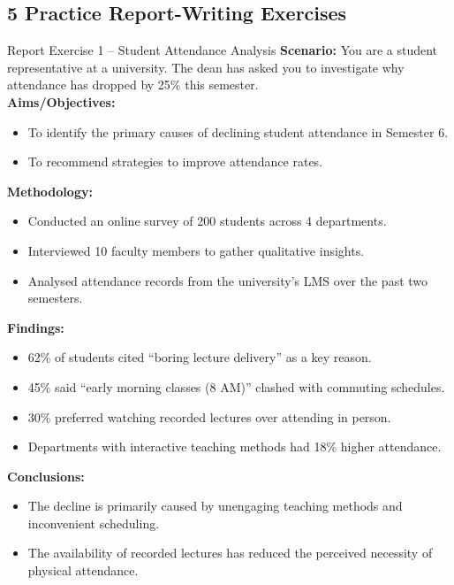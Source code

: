 \documentclass[12pt,a4paper]{article}
\begin{document}
\subsection{5 Practice Report-Writing Exercises}

\begin{exbox}{Report Exercise 1 -- Student Attendance Analysis}
\textbf{Scenario:} You are a student representative at a university. The dean has asked you to investigate why attendance has dropped by 25\% this semester.\\[0.3cm]

\textbf{Aims/Objectives:}
\begin{itemize}[noitemsep]
    \item To identify the primary causes of declining student attendance in Semester 6.
    \item To recommend strategies to improve attendance rates.
\end{itemize}

\textbf{Methodology:}
\begin{itemize}[noitemsep]
    \item Conducted an online survey of 200 students across 4 departments.
    \item Interviewed 10 faculty members to gather qualitative insights.
    \item Analysed attendance records from the university's LMS over the past two semesters.
\end{itemize}

\textbf{Findings:}
\begin{itemize}[noitemsep]
    \item 62\% of students cited ``boring lecture delivery'' as a key reason.
    \item 45\% said ``early morning classes (8 AM)'' clashed with commuting schedules.
    \item 30\% preferred watching recorded lectures over attending in person.
    \item Departments with interactive teaching methods had 18\% higher attendance.
\end{itemize}

\textbf{Conclusions:}
\begin{itemize}[noitemsep]
    \item The decline is primarily caused by unengaging teaching methods and inconvenient scheduling.
    \item The availability of recorded lectures has reduced the perceived necessity of physical attendance.
\end{itemize}


\end{exbox}
\end{document}

